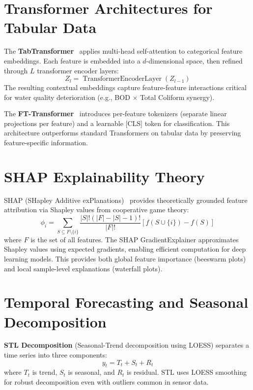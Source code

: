 \documentclass[12pt,a4paper]{report}
\numberwithin{table}{chapter}
\numberwithin{figure}{chapter}
\begin{document}
\section{Transformer Architectures for Tabular Data}

The \textbf{TabTransformer}~\cite{huang2020} applies multi-head self-attention to
categorical feature embeddings. Each feature is embedded into a $d$-dimensional space,
then refined through $L$ transformer encoder layers:
\begin{equation}
  Z_l = \operatorname{TransformerEncoderLayer}(Z_{l-1})
\end{equation}
The resulting contextual embeddings capture feature-feature interactions critical
for water quality deterioration (e.g., BOD $\times$ Total Coliform synergy).

The \textbf{FT-Transformer}~\cite{gorishniy2021} introduces per-feature tokenizers
(separate linear projections per feature) and a learnable [CLS] token for
classification. This architecture outperforms standard Transformers on tabular data
by preserving feature-specific information.

\section{SHAP Explainability Theory}

SHAP (SHapley Additive exPlanations)~\cite{lundberg2017} provides theoretically
grounded feature attribution via Shapley values from cooperative game theory:
\begin{equation}
  \phi_i = \sum_{S \subseteq F \setminus \{i\}} \frac{|S|!(|F|-|S|-1)!}{|F|!}
  [f(S \cup \{i\}) - f(S)]
\end{equation}
where $F$ is the set of all features. The SHAP GradientExplainer approximates
Shapley values using expected gradients, enabling efficient computation for deep
learning models. This provides both global feature importance (beeswarm plots) and
local sample-level explanations (waterfall plots).

\section{Temporal Forecasting and Seasonal Decomposition}

\textbf{STL Decomposition} (Seasonal-Trend decomposition using LOESS) separates a
time series into three components:
\begin{equation}
  y_t = T_t + S_t + R_t
\end{equation}
where $T_t$ is trend, $S_t$ is seasonal, and $R_t$ is residual. STL uses LOESS
smoothing for robust decomposition even with outliers common in sensor data.
\end{document}
